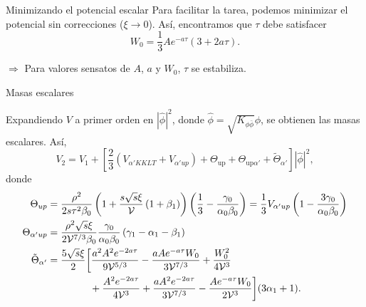 \documentclass[10pt,a4paper]{beamer}
\begin{document}
\begin{frame}{Minimizando el potencial escalar}
  Para facilitar la tarea, podemos minimizar el potencial sin correcciones ($\xi
  \to 0$). Así, encontramos que $\tau$ debe satisfacer
  \begin{equation}
  \label{min}
    W _0= 
    \frac{1}{3} A e^{-a \tau} (3+ 2a\tau).
  \end{equation}

  $\Rightarrow$ Para valores sensatos de $A$, $a$ y $W_0$, $\tau$ se estabiliza.

\end{frame}


\begin{frame}{Masas escalares}

  Expandiendo $V$ a primer orden en 
$|\hat\phi|^2$, donde $\hat \phi = \sqrt{K_{\phi\bar\phi}}\phi$, se obtienen las
masas escalares. Así,
  \begin{equation}
  \label{v2}
  V_2 = V_1 + \left[ \frac{2}{3}(V_{\alpha'KKLT} +
    V_{\alpha'up} ) + \Theta _{\text{up} } + \Theta_{\text{up}\alpha'} +    \tilde \Theta_{\alpha'}\right] |\hat\phi|^2,
\end{equation}
donde
  \begin{equation}
  \label{masas}
  \begin{aligned}
    \Theta_{up} &= \frac{\rho ^2}{2 s \tau ^2 \beta _0}\left(1 +
                   \frac{s\sqrt{s} \xi }{\mathcal{V} }\left(1+\beta_1\right)\right)\left(\frac{1}{3}-\frac{\gamma_0}{\alpha _0 \beta _0}\right) 
                 = \frac{1}{3}V_{\alpha'up}\left(1-\frac{3\gamma_0}{\alpha _0 \beta _0}\right)\\
    \Theta_{\alpha'up} &= \frac{\rho ^2 \sqrt{s} \xi }{2 \mathcal{V} ^{7/3} \beta _0}\frac{\gamma _0 }{ \alpha _0 \beta_0}
                                \left(\gamma _1- \alpha _1-\beta_1\right)\\
    \tilde \Theta _{\alpha'}&=\frac{5\sqrt{s} \xi  }{2}
     \bigg[ \frac{ a^2 A^2 e^{-2 a \tau} }{9 \mathcal{V}^{5/3}}
           -\frac{ a A e^{-a \tau} W_0  }{3 \mathcal{V}^{7/3}}
           +\frac{  W_0^2  }{4 \mathcal{V}^3} \\
       & \hskip 1.5cm
           +\frac{ A^2 e^{-2 a \tau}  }{4 \mathcal{V}^3}
           +\frac{ a A^2 e^{-2 a \tau}}{3 \mathcal{V}^{7/3}}
           -\frac{ A e^{-a \tau}W_0  }{2 \mathcal{V}^3}
   \bigg](3\alpha_1 + 1).
  \end{aligned}
\end{equation}

\end{frame}
\end{document}
